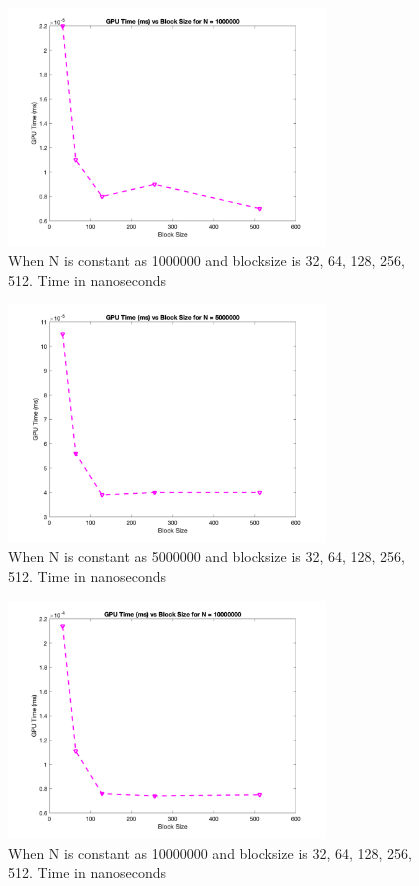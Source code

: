 \documentclass[a4paper,11pt]{article}
\theoremstyle{mytheor}
\begin{document}
\begin{figure}[!htb]
    \centering
    \includegraphics[width=0.75\textwidth]{figure1}
    \caption{When N is constant as 1000000 and blocksize is 32, 64, 128, 256, 512. Time in nanoseconds}
\end{figure}
\FloatBarrier
\begin{figure}[!htb]
    \centering
    \includegraphics[width=0.75\textwidth]{figure2}
    \caption{When N is constant as 5000000 and blocksize is 32, 64, 128, 256, 512. Time in nanoseconds}
\end{figure}

\begin{figure}[!htb]
    \centering
    \includegraphics[width=0.75\textwidth]{figure3}
    \caption{When N is constant as 10000000 and blocksize is 32, 64, 128, 256, 512. Time in nanoseconds}
\end{figure}
\end{document}
